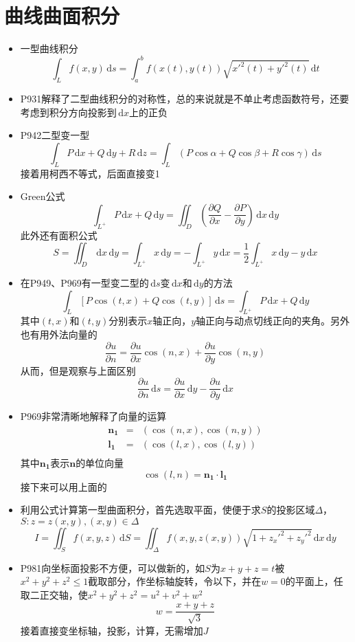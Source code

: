 \documentclass[UTF8]{ctexart}
\newcommand{\ud}{\,\mathrm{d}}
\begin{document}
\section{曲线曲面积分}
\begin{itemize}

\item 一型曲线积分
\[
\int_L f(x,y)\ud s = \int_a^b f(x(t),y(t))\sqrt{x'^2(t)+y'^2(t)}\ud t
\]

\item P931解释了二型曲线积分的对称性，总的来说就是不单止考虑函数符号，还要考虑到积分方向投影到$\ud x$上的正负

\item P942二型变一型
\[
\int_L P\ud x+ Q\ud y+ R\ud z = \int_L (P\cos\alpha + Q\cos \beta + R\cos \gamma)\ud s
\]
接着用柯西不等式，后面直接变1

\item Green公式
\[
\int_{L^+} P\ud x+ Q\ud y = \iint_D (\frac{\partial Q}{\partial x}-\frac{\partial P}{\partial y})\ud x \ud y
\]
此外还有面积公式
\[
S = \iint_D\ud x\ud y = \int_{L^+}x\ud y = - \int_{L^+}y\ud x = \frac{1}{2} \int_{L^+}x\ud y-y\ud x
\]

\item 在P949、P969有一型变二型的$\ud s$变$\ud{x}$和$\ud{y}$的方法
\[
\int_L [P\cos(t,x) + Q\cos(t,y)] \ud s = \int_{L^+} P\ud x+ Q\ud y 
\]
其中$(t,x)$和$(t,y)$分别表示$x$轴正向，$y$轴正向与动点切线正向的夹角。另外也有用外法向量的
\[
\frac{\partial u}{\partial n} = \frac{\partial u}{\partial x}\cos(n,x)+\frac{\partial u}{\partial y}\cos(n,y)
\]
从而，但是观察与上面区别
\[
\frac{\partial u}{\partial n} \ud s = \frac{\partial u}{\partial x} \ud y - \frac{\partial u}{\partial y} \ud x
\]
\item P969非常清晰地解释了向量的运算
\begin{eqnarray*}
\mathbf{n_1} &=& (\cos(n,x),\cos(n,y))\\
\mathbf{l_1} &=& (\cos(l,x),\cos(l,y))\\
\end{eqnarray*}
其中$\mathbf{n_1}$表示$\mathbf{n}$的单位向量
\[
\cos(l,n) = \mathbf{n_1}\cdot \mathbf{l_1}
\]
接下来可以用上面的

\item 利用公式计算第一型曲面积分，首先选取平面，使便于求$S$的投影区域$\Delta$，$S:z=z(x,y),(x,y)\in \Delta$
\[
I = \iint_S f(x,y,z)\ud S = \iint_\Delta f(x,y,z(x,y))\sqrt{1+z_x'^2+z_y'^2}\ud x\ud y
\]

\item P981向坐标面投影不方便，可以做新的，如$S$为$x+y+z=t$被$x^2+y^2+z^2\leq 1$截取部分，作坐标轴旋转，令以下，并在$w=0$的平面上，任取二正交轴，使$x^2+y^2+z^2=u^2+v^2+w^2$
\[
w=\frac{x+y+z}{\sqrt{3}}
\]
接着直接变坐标轴，投影，计算，无需增加$J$


\end{itemize}
\end{document}
